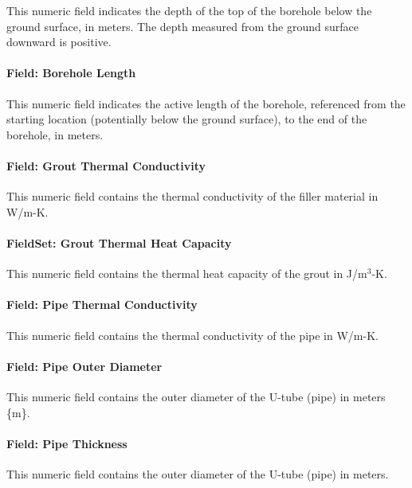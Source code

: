 This numeric field indicates the depth of the top of the borehole below the ground surface, in meters. The depth measured from the ground surface downward is positive.

\paragraph{Field: Borehole Length}

This numeric field indicates the active length of the borehole, referenced from the starting location (potentially below the ground surface), to the end of the borehole, in meters.

\paragraph{Field: Grout Thermal Conductivity}\label{field-grout-thermal-conductivity}

This numeric field contains the thermal conductivity of the filler material in W/m-K.

\paragraph{FieldSet: Grout Thermal Heat Capacity}

This numeric field contains the thermal heat capacity of the grout in J/m\(^{3}\)-K.

\paragraph{Field: Pipe Thermal Conductivity}\label{field-pipe-thermal-conductivity-000}

This numeric field contains the thermal conductivity of the pipe in W/m-K.

\paragraph{Field: Pipe Outer Diameter}\label{field-pipe-out-diameter}

This numeric field contains the outer diameter of the U-tube (pipe) in meters \{m\}.

\paragraph{Field: Pipe Thickness}\label{field-pipe-thickness-000}

This numeric field contains the outer diameter of the U-tube (pipe) in meters.

